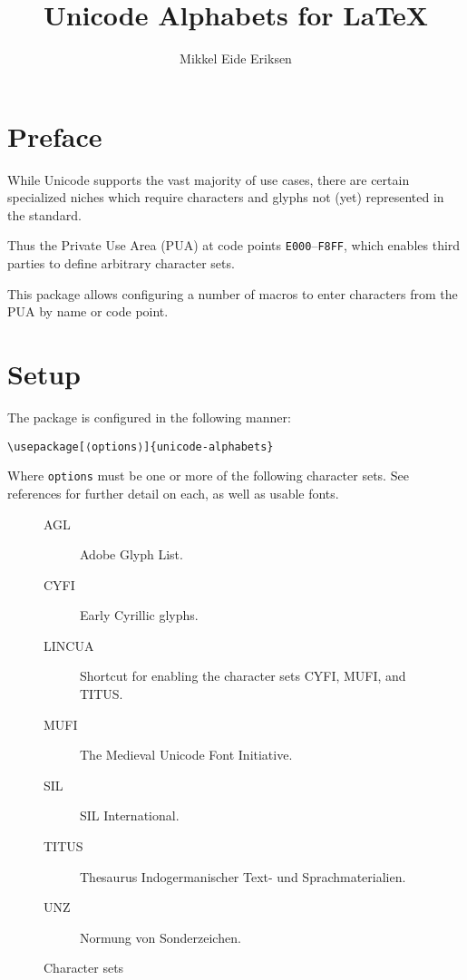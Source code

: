 \documentclass{article}
\title{Unicode Alphabets for \LaTeX}
\author{Mikkel Eide Eriksen}
\begin{document}
\maketitle

\section{Preface}

While Unicode supports the vast majority of use cases, there are certain specialized niches which require characters and glyphs not (yet) represented in the standard.

Thus the Private Use Area (PUA) at code points \texttt{E000}--\texttt{F8FF}, which enables third parties to define arbitrary character sets.

This package allows configuring a number of macros to enter characters from the PUA by name or code point.

\section{Setup}

The package is configured in the following manner:

\begin{verbatim}
\usepackage[⟨options⟩]{unicode-alphabets}
\end{verbatim}

Where \verb|options| must be one or more of the following character sets. See references for further detail on each, as well as usable fonts.

\begin{figure}[H]
\begin{description}

\item[AGL] Adobe Glyph List\cite{AGL}.
\item[CYFI] Early Cyrillic glyphs\cite{CYFI}.
\item[LINCUA] Shortcut for enabling the character sets CYFI, MUFI, and TITUS\cite{LINCUA}.
\item[MUFI] The Medieval Unicode Font Initiative\cite{MUFI}.
\item[SIL] SIL International\cite{SIL}.
\item[TITUS] Thesaurus Indogermanischer Text- und Sprachmaterialien\cite{TITUS}.
\item[UNZ] Normung von Sonderzeichen\cite{UNZ}.

\end{description}
\caption{Character sets}
\end{figure}
\end{document}
